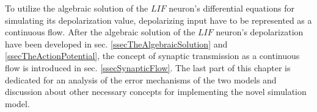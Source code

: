 \documentclass[b5paper,12 pt]{report}
\begin{document}
To utilize the algebraic solution of the $LIF$ neuron's differential equations for simulating its depolarization value, depolarizing input have to be represented as a continuous flow.
After the algebraic solution of the $LIF$ neuron's depolarization have been developed in sec.  \ref{ssecTheAlgebraicSolution} and \ref{ssecTheActionPotential},
	the concept of synaptic transmission as a continuous flow is introduced in sec. \ref{ssecSynapticFlow}.
The last part of this chapter is dedicated for an analysis of the error mechanisms of the two models and discussion about other necessary concepts for implementing the novel simulation model.

	
	








\end{document}
